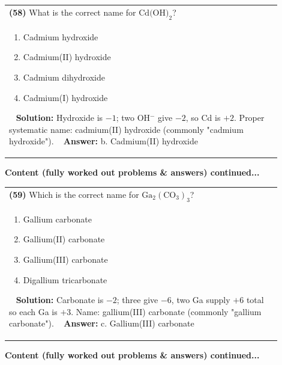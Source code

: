 \documentclass{article}
\begin{document}
\begin{tabular}{|p{0.9\linewidth}|}
\hline
\vspace{0.2cm}
\textbf{(58)} What is the correct name for $\text{Cd(OH)}_2$? \\
\begin{minipage}[t]{0.85\linewidth}
\begin{enumerate}[label=\alph*.]
\item Cadmium hydroxide \
\item Cadmium(II) hydroxide \
\item Cadmium dihydroxide \
\item Cadmium(I) hydroxide
\end{enumerate}
\end{minipage}\
\hline
\vspace{0.2cm}
\textbf{Solution:} Hydroxide is $-1$; two OH$^-$ give $-2$, so Cd is $+2$. Proper systematic name: cadmium(II) hydroxide (commonly "cadmium hydroxide"). \
\hline
\vspace{0.2cm}
\textbf{Answer:} b. Cadmium(II) hydroxide \
\hline
\end{tabular}
\newpage
\noindent
{\large\textbf{Content (fully worked out problems & answers) continued...}}\\[0.2em]
\begin{tabular}{|p{0.9\linewidth}|}
\hline
\vspace{0.2cm}
\textbf{(59)} Which is the correct name for $\text{Ga}_2(\text{CO}_3)_3$? \\
\begin{minipage}[t]{0.85\linewidth}
\begin{enumerate}[label=\alph*.]
\item Gallium carbonate \
\item Gallium(II) carbonate \
\item Gallium(III) carbonate \
\item Digallium tricarbonate
\end{enumerate}
\end{minipage}\
\hline
\vspace{0.2cm}
\textbf{Solution:} Carbonate is $-2$; three give $-6$, two Ga supply $+6$ total so each Ga is $+3$. Name: gallium(III) carbonate (commonly "gallium carbonate"). \
\hline
\vspace{0.2cm}
\textbf{Answer:} c. Gallium(III) carbonate \
\hline
\end{tabular}
\newpage
\noindent
{\large\textbf{Content (fully worked out problems & answers) continued...}}\\[0.2em]
\end{document}
